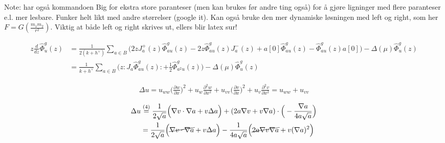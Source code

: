         Note: har også kommandoen Big for ekstra store paranteser (men kan brukes før andre ting også) for å gjøre ligninger med flere paranteser e.l. mer lesbare. Funker helt likt med andre størrelser (google it). Kan også bruke den mer dynamiske løsningen med left og right, som her \(F = G \left(  \frac{m_1 m_2}{r^2} \right)\). Viktig at både left og right skrives ut, ellers blir latex sur!

        \footnotesize %
        \begin{adjustwidth}{-4cm}{-4cm}
            \centering
            \begin{align*}
                z\frac{d}{dz} \hat{\Phi}^g_u(z) &= \frac{1}{2(k+h^\vee)}\sum_{a\in B} \Big(2zJ^+_a(z)\hat{\Phi}^g_{au}(z) - 2z\hat{\Phi}^g_{au}(z)J^-_a(z) + a[0]\hat{\Phi}^g_{au}(z) - \hat{\Phi}^g_{au}(z)a[0]\Big) - \Delta(\mu)\hat{\Phi}^g_{u}(z)
                \\ &= \frac{1}{k+h^\vee} \sum_{a\in B} \Big(z : J_a \hat{\Phi}^g_{au}(z): + \frac{1}{2}\hat{\Phi}^g_{a^2u}(z)\Big) - \Delta(\mu)\hat{\Phi}^g_{u}(z)
            \end{align*}
        \end{adjustwidth}
        
        
        \normalsize %
        \begin{align*}
            \Delta u= u_{ww} \Big( \frac{\partial w}{\partial x} \Big) ^2 + u_w \frac{\partial ^2 w}{\partial x^2}+u_{vv} \Big( \frac{\partial v}{\partial x} \Big) ^2 + u_v \frac{\partial ^2 v}{\partial x^2} = u_{ww}+u_{vv}
        \end{align*}
            
        \begin{align} 
            \Delta u &\stackrel{(4)}{=} \frac{1}{2\sqrt{a}} \Big(\nabla v \cdot \nabla a + v\Delta a\Big) + (2a\nabla v + v\nabla a) \cdot \Big(-\frac{\nabla a}{4a\sqrt{a}}\Big)
            \\ &= \frac{1}{2\sqrt{a}} \Big(\cancel{\nabla v \cdot \nabla a} + v\Delta a\Big) -\frac{1}{4a\sqrt{a}}\Big(\cancel{2a\nabla v\nabla a} + v(\nabla a)^2\Big)
        \end{align}    
            
